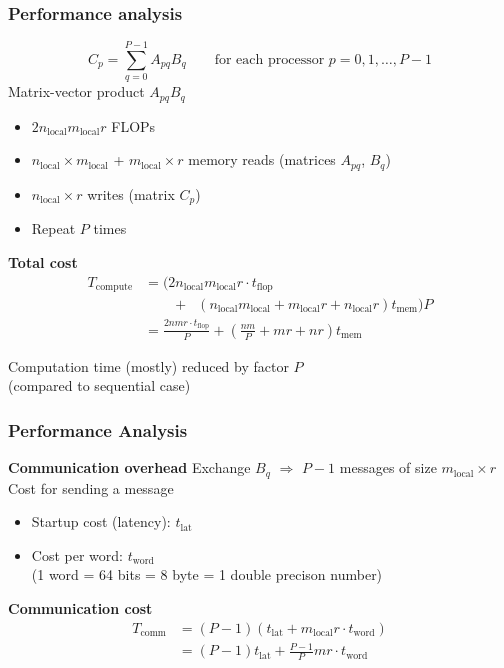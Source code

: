 \documentclass{beamer}
\begin{document}
\begin{frame}
  \frametitle{Performance analysis}
  $$
C_p = \sum_{q=0}^{P-1} A_{pq} B_q \qquad\text{for each processor $p=0,1,\dots,P-1$}
$$
  Matrix-vector product $A_{pq}B_q$ 
  \begin{itemize}
\item $2n_{\text{local}}m_{\text{local}}r$ FLOPs
\item $n_{\text{local}} \times m_{\text{local}}$ + $m_{\text{local}}\times r$ memory reads (matrices $A_{pq}$, $B_q$)
\item $n_{\text{local}}\times r$ writes (matrix $C_p$)
\item Repeat $P$ times
  \end{itemize}
\textbf{Total cost}
$$
\begin{aligned}
T_{\text{compute}} &= \Big(2n_{\text{local}}m_{\text{local}}r\cdot t_{\text{flop}}\\
&\qquad+\;\; \left(n_{\text{local}}m_{\text{local}}+m_{\text{local}}r+n_{\text{local}}r\right)t_{\text{mem}}\Big)P\\
&=\frac{2nmr\cdot t_{\text{flop}}}{P}+\left(\frac{nm}{P}+mr+nr\right)t_{\text{mem}}
\end{aligned}
$$
\begin{center}
Computation time (mostly) reduced by factor $P$\\{\footnotesize(compared to sequential case)}
\end{center}
\end{frame}


\begin{frame}
  \frametitle{Performance Analysis}
  \textbf{Communication overhead}
  Exchange $B_q$ $\Rightarrow$ $P-1$ messages of size $m_{\text{local}}\times r$\\[1ex]
  Cost for sending a message
  \begin{itemize}
  \item Startup cost (latency): $t_{\text{lat}}$
  \item Cost per word: $t_{\text{word}}$\\
  {\footnotesize(1 word = 64 bits = 8 byte = 1 double precison number)}
  \end{itemize}
  \textbf{Communication cost}
$$
\begin{aligned}
T_{\text{comm}} &= (P-1)\left(t_{\text{lat}} + m_{\text{local}}r\cdot t_{\text{word}}\right)\\
&= (P-1)t_{\text{lat}} + \frac{P-1}{P} mr\cdot t_{\text{word}}
\end{aligned}
$$
\end{frame}
\end{document}

